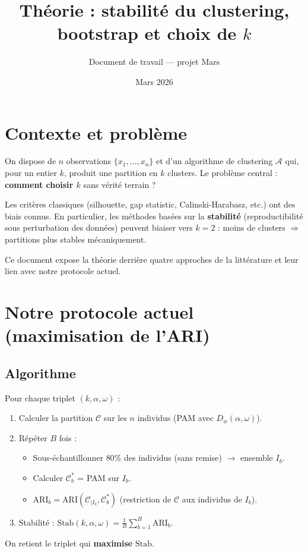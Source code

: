 \documentclass[11pt, a4paper]{article}
\title{Théorie : stabilité du clustering, bootstrap et choix de $k$}
\author{Document de travail — projet Mars}
\date{Mars 2026}
\begin{document}
\maketitle
\tableofcontents
\newpage

\section{Contexte et problème}

On dispose de $n$ observations $\{x_1, \ldots, x_n\}$ et d'un algorithme de clustering $\mathcal{A}$ qui, pour un entier $k$, produit une partition en $k$ clusters. Le problème central : \textbf{comment choisir $k$} sans vérité terrain ?

Les critères classiques (silhouette, gap statistic, Calinski-Harabasz, etc.) ont des biais connus. En particulier, les méthodes basées sur la \textbf{stabilité} (reproductibilité sous perturbation des données) peuvent biaiser vers $k=2$ : moins de clusters $\Rightarrow$ partitions plus stables mécaniquement.

Ce document expose la théorie derrière quatre approches de la littérature et leur lien avec notre protocole actuel.

\section{Notre protocole actuel (maximisation de l'ARI)}

\subsection{Algorithme}

Pour chaque triplet $(k, \alpha, \omega)$ :
\begin{enumerate}
  \item Calculer la partition $\mathcal{C}$ sur les $n$ individus (PAM avec $D_w(\alpha, \omega)$).
  \item Répéter $B$ fois :
  \begin{itemize}
    \item Sous-échantillonner $80\%$ des individus (sans remise) $\to$ ensemble $I_b$.
    \item Calculer $\mathcal{C}_b^*$ = PAM sur $I_b$.
    \item $\text{ARI}_b = \text{ARI}(\mathcal{C}_{|I_b}, \mathcal{C}_b^*)$ (restriction de $\mathcal{C}$ aux individus de $I_b$).
  \end{itemize}
  \item Stabilité : $\text{Stab}(k, \alpha, \omega) = \frac{1}{B}\sum_{b=1}^B \text{ARI}_b$.
\end{enumerate}
On retient le triplet qui \textbf{maximise} $\text{Stab}$.
\end{document}
